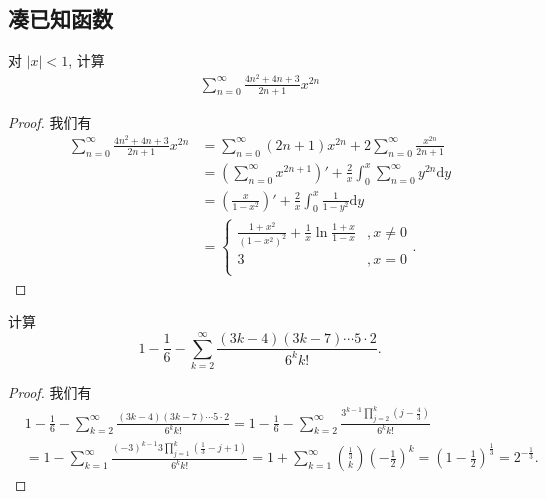 \documentclass[../../main.tex]{subfiles}
\begin{document}
\subsection{凑已知函数}

\begin{example}
对 \(|x| < 1\), 计算
\begin{align*}
\sum_{n=0}^{\infty} \frac{4n^2 + 4n + 3}{2n + 1} x^{2n}
\end{align*}
\end{example}
\begin{proof}
我们有
\begin{align*}
\sum_{n=0}^{\infty} \frac{4n^2 + 4n + 3}{2n + 1} x^{2n} &= \sum_{n=0}^{\infty} (2n + 1) x^{2n} + 2 \sum_{n=0}^{\infty} \frac{x^{2n}}{2n + 1} \\
&= \left( \sum_{n=0}^{\infty} x^{2n + 1} \right)' + \frac{2}{x} \int_{0}^{x} \sum_{n=0}^{\infty} y^{2n} \mathrm{d}y \\
&= \left( \frac{x}{1 - x^2} \right)' + \frac{2}{x} \int_{0}^{x} \frac{1}{1 - y^2} \mathrm{d}y \\
&=\begin{cases}
\frac{1+x^2}{(1-x^2)^2}+\frac{1}{x}\ln \frac{1+x}{1-x}&,x\ne 0\\
3&,x=0\\
\end{cases}.
\end{align*}
\end{proof}

\begin{example}
计算
\[
1 - \frac{1}{6} - \sum_{k=2}^{\infty} \frac{(3k - 4)(3k - 7) \cdots 5 \cdot 2}{6^k k!}.
\]
\end{example}
\begin{proof}
我们有
\begin{align*}
&1 - \frac{1}{6} - \sum_{k=2}^{\infty} \frac{(3k - 4)(3k - 7) \cdots 5 \cdot 2}{6^k k!}= 1 - \frac{1}{6} - \sum_{k=2}^{\infty} \frac{3^{k - 1} \prod\limits_{j=2}^{k} \left(j - \frac{4}{3}\right)}{6^k k!}\\
&= 1 - \sum_{k=1}^{\infty} \frac{(-3)^{k - 1} 3 \prod\limits_{j=1}^{k} \left(\frac{1}{3} - j + 1\right)}{6^k k!}= 1 + \sum_{k=1}^{\infty} \binom{\frac{1}{3}}{k} \left(-\frac{1}{2}\right)^k = \left(1 - \frac{1}{2}\right)^{\frac{1}{3}} = 2^{-\frac{1}{3}}.
\end{align*}
\end{proof}
\end{document}
